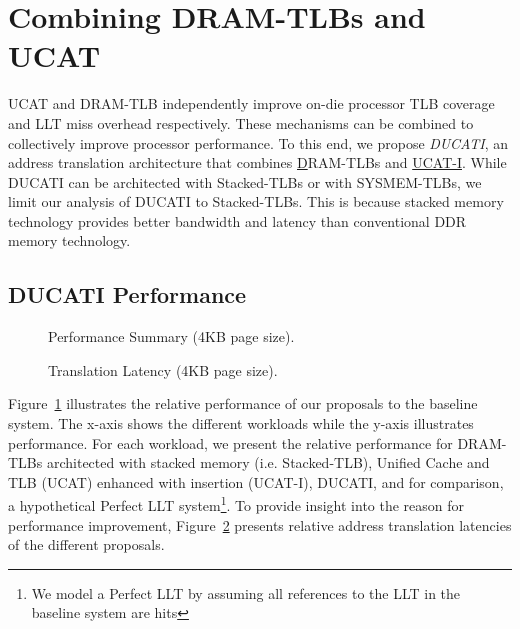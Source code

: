 \newpage
\section{Combining DRAM-TLBs and UCAT}
\label{sec:DUCATI}

\noindent UCAT and DRAM-TLB independently improve on-die processor TLB
coverage and LLT miss overhead respectively. These mechanisms can be
combined to collectively improve processor performance. To this end,
we propose {\em DUCATI}, an address translation architecture that
combines \underline{D}RAM-TLBs and \underline{UCAT-I}. While DUCATI
can be architected with Stacked-TLBs or with SYSMEM-TLBs, we limit our
analysis of DUCATI to Stacked-TLBs. This is because stacked memory
technology provides better bandwidth and latency than
conventional DDR memory technology.

\subsection{DUCATI Performance}

\begin{figure}[tp] 
\vspace{-0.0 in} \centering
\centerline{}

\caption{\small Performance Summary (4KB page size).\normalsize}
\label{fig:summary_4k_pages_perf} 
\vspace{0.1 in}
\end{figure}

\begin{figure}[tp] 
\vspace{0.1 in} \centering
\centerline{}

\caption{\small Translation Latency (4KB page size).\normalsize}
\label{fig:summary_4k_pages_lat} 
\vspace{-0.1 in}
\end{figure}

\noindent Figure~\ref{fig:summary_4k_pages_perf} illustrates the
relative performance of our proposals to the baseline system. The
x-axis shows the different workloads while the y-axis illustrates
performance. For each workload, we present the relative performance
for DRAM-TLBs architected with stacked memory (i.e. Stacked-TLB),
Unified Cache and TLB (UCAT) enhanced with insertion (UCAT-I), DUCATI,
and for comparison, a hypothetical Perfect LLT system\footnote{We
model a Perfect LLT by assuming all references to the LLT in the
baseline system are hits}. To provide insight into the reason for
performance improvement, Figure~\ref{fig:summary_4k_pages_lat}
presents relative address translation latencies of the different
proposals. 


